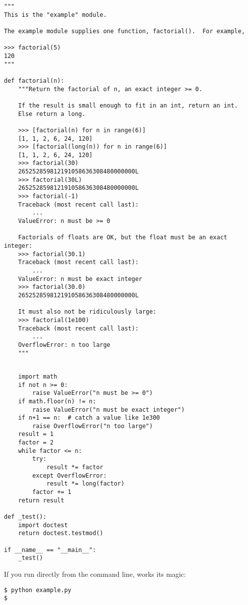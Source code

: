 \begin{verbatim}
"""
This is the "example" module.

The example module supplies one function, factorial().  For example,

>>> factorial(5)
120
"""

def factorial(n):
    """Return the factorial of n, an exact integer >= 0.

    If the result is small enough to fit in an int, return an int.
    Else return a long.

    >>> [factorial(n) for n in range(6)]
    [1, 1, 2, 6, 24, 120]
    >>> [factorial(long(n)) for n in range(6)]
    [1, 1, 2, 6, 24, 120]
    >>> factorial(30)
    265252859812191058636308480000000L
    >>> factorial(30L)
    265252859812191058636308480000000L
    >>> factorial(-1)
    Traceback (most recent call last):
        ...
    ValueError: n must be >= 0

    Factorials of floats are OK, but the float must be an exact integer:
    >>> factorial(30.1)
    Traceback (most recent call last):
        ...
    ValueError: n must be exact integer
    >>> factorial(30.0)
    265252859812191058636308480000000L

    It must also not be ridiculously large:
    >>> factorial(1e100)
    Traceback (most recent call last):
        ...
    OverflowError: n too large
    """

\end{verbatim}
\begin{verbatim}

    import math
    if not n >= 0:
        raise ValueError("n must be >= 0")
    if math.floor(n) != n:
        raise ValueError("n must be exact integer")
    if n+1 == n:  # catch a value like 1e300
        raise OverflowError("n too large")
    result = 1
    factor = 2
    while factor <= n:
        try:
            result *= factor
        except OverflowError:
            result *= long(factor)
        factor += 1
    return result

def _test():
    import doctest
    return doctest.testmod()

if __name__ == "__main__":
    _test()
\end{verbatim}

If you run  directly from the command line,
 works its magic:

\begin{verbatim}
$ python example.py
$
\end{verbatim}

